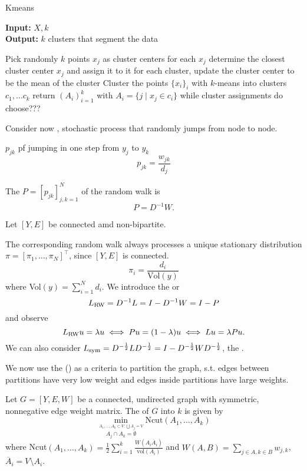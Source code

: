 \begin{algorithm}[H] %
    \caption{Kmeans}\label{alg:k_means}
 \textbf{Input:}  $X,k$\\
 \textbf{Output:} $k$ clusters that segment the data
 \begin{algorithmic}
    \State Pick randomly $k$ points $x_j$ as cluster centers
        \State for each $x_j$ determine the closest cluster center $x_j$ and assign it to it 
        \State for each cluster, update the cluster center to be the mean of the cluster
    \EndWhile
    \State Cluster the points $\{x_i\}_i$ with $k$-means into clusters $c_1,\dots c_k$
    \State return $(A_i)_{i=1}^k$ with $A_i=\{j\mid x_j\in c_i\}$
    \State while cluster assignments do choose???
 \end{algorithmic}
\end{algorithm}

Consider now , stochastic process that 
randomly jumps from node to node.

 $p_{jk}$ pf jumping in one step from 
$y_j$ to $y_k$
\[p_{jk}=\frac{w_{jk}}{d_j}\]

The  $P=[p_{jk}]_{j,k=1}^N$ of the random walk is 
\[P=D^{-1}W.\]

Let $[Y,E]$ be connected amd non-bipartite.

The corresponding random walk always processes a unique stationary distribution $\pi=[\pi_1,\dots,\pi_N]^\intercal$, since $[Y,E]$ is connected.
\[\pi_i=\frac{d_i}{\text{Vol}(y)}\]
where Vol$(y)=\sum_{i=1}^N d_i$.
We introduce the  or 
\[L_{\text{RW}}=D^{-1}L=I-D^{-1}W=I-P\]
and observe \[L_{\text{RW}} u = \lambda u \iff Pu = (1-\lambda)u\iff Lu = \lambda Pu.\]
We can also consider $L_{\text{sym}}=D^{-\frac{1}{2}}L D^{-\frac{1}{2}} = I-D^{-\frac{1}{2}} W D^{-\frac{1}{2}}$,
the .

We now use the  () as a criteria to partition the graph, s.t. 
edges between partitions have very low weight and edges inside partitions have large weights.

\begin{definition}\label{def:2.24}
    Let $G=[Y,E,W]$ be a connected, undirected graph with symmetric, nonnegative edge weight matrix.
    The  of $G$ into $k$  is given by 
    \[\min_{\stackrel{A_1,\dots,A_k\subset V:\bigcup A_j=V}{A_j\cap A_k=\emptyset}} \text{Ncut}(A_1,\dots,A_k)\]
    where Ncut$(A_1,\dots,A_k)=\frac{1}{2}\sum_{i=1}^k \frac{W(A_i\overline{A}_i)}{\text{vol}(A_i)}$
    and $W(A,B)=\sum_{j\in A,k\in B}w_{j,k}$, $\overline{A}_i = V\setminus A_i$.
\end{definition}

